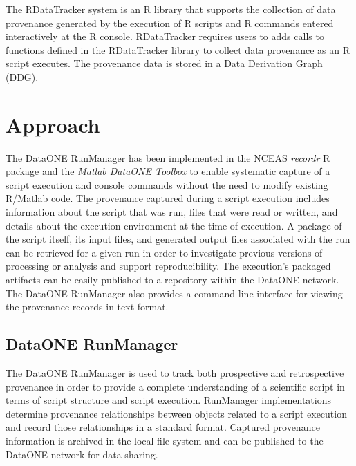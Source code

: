 \documentclass[runningheads,a4paper]{llncs}
\begin{document}
{The RDataTracker \cite{rdatatracker} system is an R library that supports the collection of data provenance generated by the execution of R scripts and R commands entered interactively at the R console. RDataTracker requires users to adds calls to functions defined in the RDataTracker library to collect data provenance as an R script executes. The provenance data is stored in a Data Derivation Graph (DDG).




\section{Approach}   \label{desc-runManager}

The DataONE RunManager has been implemented in the NCEAS \emph{recordr} R package \cite{recordr} and the \emph{Matlab DataONE Toolbox} \cite{matlabdataone} to enable systematic capture of a script execution and console commands without the need to modify existing R/Matlab code. The provenance captured during a script execution includes information about the script that was run, files that were read or written, and details about the execution environment at the time of execution. A package of the script itself, its input files, and generated output files associated with the run can be retrieved for a given run in order to investigate previous versions of processing or analysis and support reproducibility. The execution's packaged artifacts can be easily published to a repository within the DataONE network. The DataONE RunManager also provides a command-line interface for viewing the provenance records in text format. 

\subsection{DataONE RunManager}

The DataONE RunManager is used to track both prospective and retrospective provenance in order to provide a complete understanding of a scientific script in terms of script structure and script execution. RunManager implementations determine provenance relationships between objects related to a script execution and record those relationships in a standard format. Captured provenance information is archived in the local file system and can be published to the DataONE network for data sharing. 



}
\end{document}
